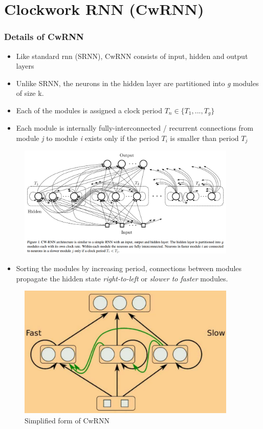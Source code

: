 \documentclass{beamer}
\begin{document}
\section{Clockwork RNN (CwRNN)}
\frame
{
   \frametitle{Details of CwRNN}
   \begin{itemize}
   	\item Like standard rnn (SRNN), CwRNN consists of input, hidden and output layers
   	\item Unlike SRNN, the neurons in the hidden layer are partitioned into \textit{g} modules of size k. 
   	\item Each of the modules is assigned a clock period ${T_n \in \{T_1, ..., T_g\} }$ 
   	\item Each module is internally fully-interconnected / recurrent connections from module \textit{j} to module \textit{i} exists only if the period ${T_i}$ is smaller than period ${T_j}$
   \end{itemize}
}
\frame
{
	\begin{figure}[ht]  
		\begin{center}
			\includegraphics[width=4.1in]{Images/cwrnn.png}   
		\end{center}   
	\end{figure}
   \begin{itemize}
   	\item Sorting the modules by increasing period, connections between modules propagate the hidden state \textit{right-to-left} or \textit{slower to faster} modules.
   \end{itemize}
}
\frame
{
	\begin{figure}[ht]  
		\begin{center}
			\includegraphics[width=4.1in]{Images/cwrnn_fast_slow.png}   
		\end{center}   
		\caption{Simplified form of CwRNN}
	\end{figure}
}
\end{document}
